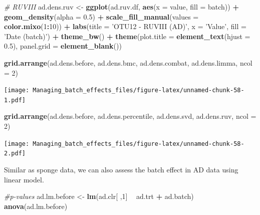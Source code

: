 \documentclass[]{book}
\newenvironment{Shaded}{\begin{snugshade}}{\end{snugshade}}
\newcommand{\KeywordTok}[1]{\textcolor[rgb]{0.13,0.29,0.53}{\textbf{#1}}}
\newcommand{\DataTypeTok}[1]{\textcolor[rgb]{0.13,0.29,0.53}{#1}}
\newcommand{\DecValTok}[1]{\textcolor[rgb]{0.00,0.00,0.81}{#1}}
\newcommand{\FloatTok}[1]{\textcolor[rgb]{0.00,0.00,0.81}{#1}}
\newcommand{\StringTok}[1]{\textcolor[rgb]{0.31,0.60,0.02}{#1}}
\newcommand{\CommentTok}[1]{\textcolor[rgb]{0.56,0.35,0.01}{\textit{#1}}}
\newcommand{\OperatorTok}[1]{\textcolor[rgb]{0.81,0.36,0.00}{\textbf{#1}}}
\newcommand{\NormalTok}[1]{#1}
\begin{document}
\begin{Shaded}
\begin{Highlighting}[]
\CommentTok{# RUVIII}
\NormalTok{ad.dens.ruv <-}\StringTok{ }\KeywordTok{ggplot}\NormalTok{(ad.ruv.df, }\KeywordTok{aes}\NormalTok{(}\DataTypeTok{x =}\NormalTok{ value, }\DataTypeTok{fill =}\NormalTok{ batch)) }\OperatorTok{+}\StringTok{ }
\StringTok{  }\KeywordTok{geom_density}\NormalTok{(}\DataTypeTok{alpha =} \FloatTok{0.5}\NormalTok{) }\OperatorTok{+}\StringTok{ }\KeywordTok{scale_fill_manual}\NormalTok{(}\DataTypeTok{values =} \KeywordTok{color.mixo}\NormalTok{(}\DecValTok{1}\OperatorTok{:}\DecValTok{10}\NormalTok{)) }\OperatorTok{+}\StringTok{ }
\StringTok{  }\KeywordTok{labs}\NormalTok{(}\DataTypeTok{title =} \StringTok{'OTU12 - RUVIII (AD)'}\NormalTok{, }\DataTypeTok{x =} \StringTok{'Value'}\NormalTok{, }\DataTypeTok{fill =} \StringTok{'Date (batch)'}\NormalTok{) }\OperatorTok{+}\StringTok{ }
\StringTok{  }\KeywordTok{theme_bw}\NormalTok{() }\OperatorTok{+}\StringTok{ }\KeywordTok{theme}\NormalTok{(}\DataTypeTok{plot.title =} \KeywordTok{element_text}\NormalTok{(}\DataTypeTok{hjust =} \FloatTok{0.5}\NormalTok{), }
                     \DataTypeTok{panel.grid =} \KeywordTok{element_blank}\NormalTok{())}
\end{Highlighting}
\end{Shaded}

\begin{Shaded}
\begin{Highlighting}[]
\KeywordTok{grid.arrange}\NormalTok{(ad.dens.before, ad.dens.bmc, }
\NormalTok{             ad.dens.combat, ad.dens.limma, }\DataTypeTok{ncol =} \DecValTok{2}\NormalTok{)}
\end{Highlighting}
\end{Shaded}

\texttt{[image: Managing\_batch\_effects\_files/figure-latex/unnamed-chunk-58-1.pdf]}

\begin{Shaded}
\begin{Highlighting}[]
\KeywordTok{grid.arrange}\NormalTok{(ad.dens.before, ad.dens.percentile, }
\NormalTok{             ad.dens.svd, ad.dens.ruv, }\DataTypeTok{ncol =} \DecValTok{2}\NormalTok{)}
\end{Highlighting}
\end{Shaded}

\texttt{[image: Managing\_batch\_effects\_files/figure-latex/unnamed-chunk-58-2.pdf]}

Similar as sponge data, we can also assess the batch effect in AD data
using linear model.

\begin{Shaded}
\begin{Highlighting}[]
\CommentTok{#p-values}
\NormalTok{ad.lm.before <-}\StringTok{ }\KeywordTok{lm}\NormalTok{(ad.clr[ ,}\DecValTok{1}\NormalTok{] }\OperatorTok{~}\StringTok{ }\NormalTok{ad.trt }\OperatorTok{+}\StringTok{ }\NormalTok{ad.batch)}
\KeywordTok{anova}\NormalTok{(ad.lm.before)}
\end{Highlighting}
\end{Shaded}
\end{document}
